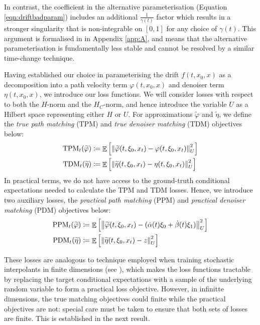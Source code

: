In contrast, the coefficient in the alternative parameterisation (Equation \ref{eqn:driftbadparam}) includes an additional \(\frac{1}{\gamma(t)}\) factor which results in a stronger singularity that is non-integrable on \([0, 1]\) for any choice of \(\gamma(t)\). This argument is formalised in  in Appendix \cref{app:A}, and means that the alternative parameterisation is fundamentally less stable and cannot be resolved by a similar time-change technique.

Having established our choice in parameterising the drift \(f(t, x_{0}, x)\) as a decomposition into a path velocity term \(\varphi(t, x_{0}, x)\) and denoiser term \(\eta(t, x_{0}, x)\), we introduce our loss functions. We will consider losses with respect to both the \(H\)-norm and the \(H_{C}\)-norm, and hence introduce the variable \(U\) as a Hilbert space representing either \(H\) or \(U\). For approximations \(\widetilde{\varphi}\) and \(\widetilde{\eta}\), we define the \textit{true path matching} (TPM) and \textit{true denoiser matching} (TDM) objectives below:
\begin{align}
  \mathrm{TPM}_{t}(\widetilde{\varphi}) &\coloneqq \mathop{\mathbb{E}}\qty[\norm{ \widetilde{\varphi}(t, \xi_{0}, x_{t}) - \varphi(t, \xi_{0}, x_{t})}^{2}_{U}]\label{eqn:tpm} \\
  \mathrm{TDM}_{t}(\widetilde{\eta}) &\coloneqq \mathop{\mathbb{E}}\qty[\norm{ \widetilde{\eta}(t, \xi_{0}, x_{t}) - \eta(t, \xi_{0}, x_{t})}^{2}_{U}] \label{eqn:tdm}
\end{align}
In practical terms, we do not have access to the ground-truth conditional expectations needed to calculate the TPM and TDM losses. Hence, we introduce two auxiliary losses, the \textit{practical path matching} (PPM) and \textit{practical denoiser matching} (PDM) objectives below:
\begin{align}
  \mathrm{PPM}_{t}(\widetilde{\varphi}) &\coloneqq \mathop{\mathbb{E}}\qty[\norm{ \widetilde{\varphi}(t, \xi_{0}, x_{t}) - (\dot{\alpha}(t) \xi_{0} + \dot{\beta}(t) \xi_{1})}^{2}_{U}] \label{eqn:ppm}\\
  \mathrm{PDM}_{t}(\widetilde{\eta}) &\coloneqq \mathop{\mathbb{E}}\qty[\norm{ \widetilde{\eta}(t, \xi_{0}, x_{t}) - z}^{2}_{U}] \label{eqn:pdm}
\end{align}

These losses are analogous to technique employed when training stochastic interpolants in finite dimensions (see \citealp[][Theorems 2.7--2.8]{albergo2023stochasticinterpolantsunifyingframework}), which makes the loss functions tractable by replacing the target conditional expectations with a sample of the underlying random variable to form a practical loss objective. However, in infinitte dimensions, the true matching objectives could finite while the practical objectives are not: special care must be taken to ensure that both sets of losses are finite. This is established in the next result.

